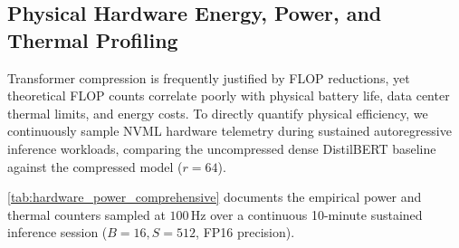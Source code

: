 \subsection{Physical Hardware Energy, Power, and Thermal Profiling}
\label{sec:results_power_thermal}

Transformer compression is frequently justified by FLOP reductions, yet theoretical FLOP counts correlate poorly with physical battery life, data center thermal limits, and energy costs. To directly quantify physical efficiency, we continuously sample NVML hardware telemetry during sustained autoregressive inference workloads, comparing the uncompressed dense DistilBERT baseline against the \neuralops{} compressed model ($r=64$).

\cref{tab:hardware_power_comprehensive} documents the empirical power and thermal counters sampled at $100\,\text{Hz}$ over a continuous 10-minute sustained inference session ($B=16, S=512$, FP16 precision).

